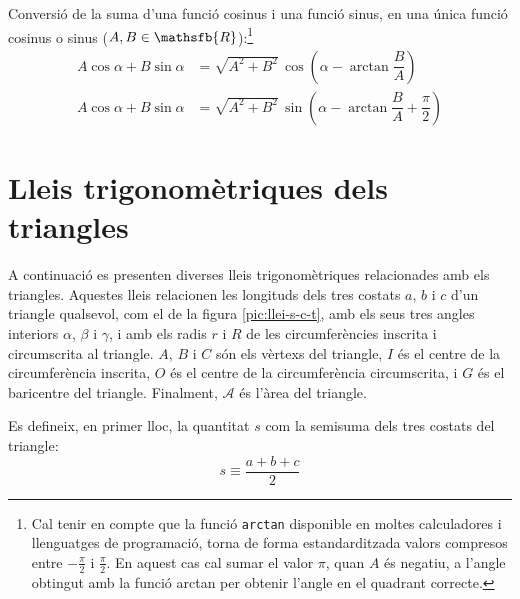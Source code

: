 Conversió de la suma d'una funció cosinus i una funció sinus, en una única
funció cosinus o sinus ($A,B\in\mathsfb{R}$):\footnote{Cal tenir en compte que la funció \texttt{arctan} disponible en moltes calculadores i llenguatges de programació, torna de forma estandarditzada valors compresos entre $-\frac{\pi}{2}$ i $\frac{\pi}{2}$. En aquest cas cal sumar el valor $\pi$, quan $A$ és negatiu, a l'angle obtingut amb la funció \textsf{arctan} per obtenir l'angle en el quadrant correcte.}
\begin{subequations}
\begin{align}
    A \cos \alpha + B \sin \alpha &= \sqrt{A^2+B^2}\, \cos \left(\alpha - \arctan\dfrac{B}{A}\right)\label{eq:AcosBsin}\\[1ex]
    A \cos \alpha + B \sin \alpha &= \sqrt{A^2+B^2}\, \sin \left(\alpha - \arctan\dfrac{B}{A}+\dfrac{\pi}{2}\right)\label{eq:AcosBsinS}
\end{align}
\end{subequations}

\break

\section{Lleis trigonomètriques dels triangles}\label{sec:lleis-trig-triang}

A continuació es presenten diverses lleis trigonomètriques relacionades amb els triangles. Aquestes lleis relacionen les longituds dels tres costats $a$, $b$ i $c$ d'un triangle qualsevol, com el de
la figura \vref{pic:llei-s-c-t}, amb els seus tres angles interiors
$\alpha$, $\beta$ i $\gamma$, i amb els radis $r$ i $R$ de les circumferències inscrita i circumscrita al triangle. $A$, $B$ i $C$ són els vèrtexs del triangle, $I$ és el centre de la circumferència inscrita, $O$   és el centre de la circumferència circumscrita, i $G$ és el baricentre del triangle. Finalment, $\mathscr{A}$ és l'àrea del triangle.

\begin{center}
    
     \label{pic:llei-s-c-t}
\end{center}

Es defineix, en primer lloc, la quantitat $s$ com la semisuma dels tres costats del triangle:
\begin{equation}
	s \equiv \frac{a+b+c}{2}
\end{equation}

